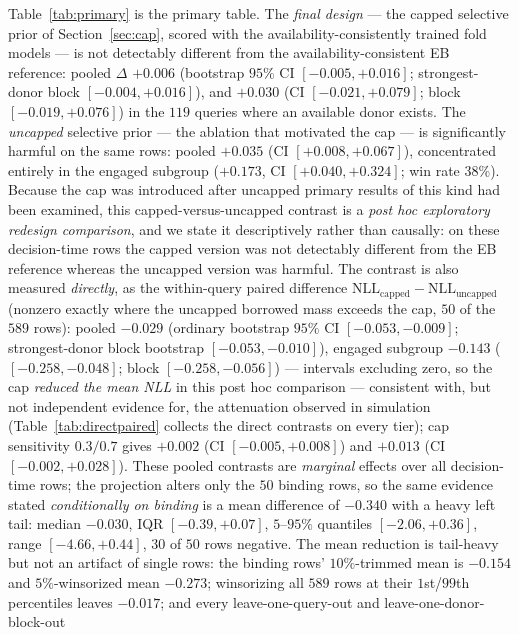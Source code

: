 \documentclass[11pt]{article}
\begin{document}
Table~\ref{tab:primary} is the primary table. The \emph{final design} --- the
capped selective prior of Section~\ref{sec:cap}, scored with the
availability-consistently trained fold models --- is not detectably
different from the availability-consistent EB reference: pooled $\Delta$
$+0.006$ (bootstrap $95\%$ CI $[-0.005, +0.016]$; strongest-donor block
$[-0.004, +0.016]$), and $+0.030$ (CI $[-0.021, +0.079]$; block
$[-0.019, +0.076]$) in the $119$ queries where an available donor exists.
The \emph{uncapped} selective prior --- the ablation that motivated the cap
--- is significantly harmful on the same rows: pooled $+0.035$
(CI $[+0.008, +0.067]$), concentrated entirely in the engaged subgroup
($+0.173$, CI $[+0.040, +0.324]$; win rate $38\%$). Because the cap was
introduced after uncapped primary results of this kind had been examined,
this capped-versus-uncapped contrast is a \emph{post hoc exploratory
redesign comparison}, and we state it descriptively rather than causally:
on these decision-time rows the capped version was not detectably
different from the EB reference whereas the uncapped version was harmful.
The contrast is also measured \emph{directly}, as the within-query paired
difference $\mathrm{NLL}_{\mathrm{capped}} -
\mathrm{NLL}_{\mathrm{uncapped}}$ (nonzero exactly where the uncapped
borrowed mass exceeds the cap, $50$ of the $589$ rows): pooled $-0.029$
(ordinary bootstrap $95\%$ CI $[-0.053,-0.009]$; strongest-donor block
bootstrap $[-0.053,-0.010]$), engaged subgroup $-0.143$
($[-0.258,-0.048]$; block $[-0.258,-0.056]$) --- intervals excluding
zero, so the cap \emph{reduced the mean NLL} in this post hoc comparison
--- consistent with, but
not independent
evidence for, the attenuation observed in simulation
(Table~\ref{tab:directpaired} collects the direct contrasts on every
tier); cap sensitivity
$0.3/0.7$ gives $+0.002$ (CI $[-0.005,+0.008]$) and $+0.013$
(CI $[-0.002,+0.028]$). These pooled contrasts are \emph{marginal}
effects over all decision-time rows; the projection alters only the $50$
binding rows, so the same evidence stated \emph{conditionally on
binding} is a mean difference of $-0.340$ with a heavy left tail: median
$-0.030$, IQR $[-0.39,+0.07]$, $5$--$95\%$ quantiles $[-2.06,+0.36]$,
range $[-4.66,+0.44]$, $30$ of $50$ rows negative. The mean reduction is
tail-heavy but not an artifact of single rows: the binding rows'
$10\%$-trimmed mean is $-0.154$ and $5\%$-winsorized mean $-0.273$;
winsorizing all $589$ rows at their $1$st/$99$th percentiles leaves
$-0.017$; and every leave-one-query-out and leave-one-donor-block-out
\end{document}
